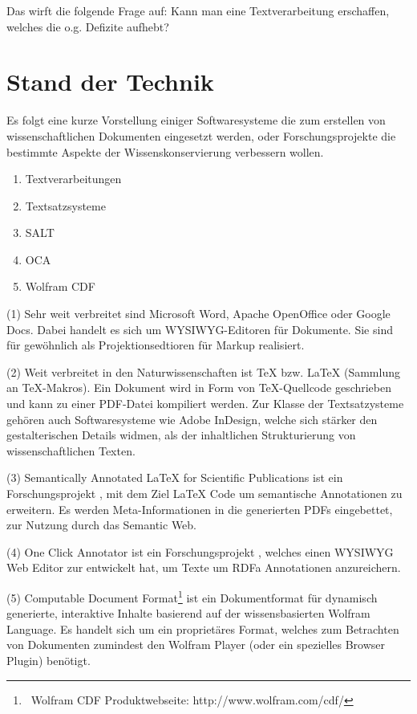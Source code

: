 Das wirft die folgende Frage auf: Kann man eine Textverarbeitung erschaffen, welches die o.g. Defizite aufhebt?

 
\section{Stand der Technik}\label{stand-der-technik}
 
Es folgt eine kurze Vorstellung einiger Softwaresysteme die zum erstellen von wissenschaftlichen Dokumenten eingesetzt werden, oder Forschungsprojekte die bestimmte Aspekte der Wissenskonservierung verbessern wollen.

 
\begin{enumerate}

\item Textverarbeitungen
\item Textsatzsysteme
\item SALT
\item OCA
\item Wolfram CDF
\end{enumerate}
 
(1) Sehr weit verbreitet sind Microsoft Word, Apache OpenOffice oder Google Docs. Dabei handelt es sich um WYSIWYG-Editoren für Dokumente. Sie sind für gewöhnlich als Projektionsedtioren für Markup realisiert.

 
(2) Weit verbreitet in den Naturwissenschaften ist TeX bzw. LaTeX (Sammlung an TeX-Makros). Ein Dokument wird in Form von TeX-Quellcode geschrieben und kann zu einer PDF-Datei kompiliert werden. Zur Klasse der Textsatzysteme gehören auch Softwaresysteme wie Adobe InDesign, welche sich stärker den gestalterischen Details widmen, als der inhaltlichen Strukturierung von wissenschaftlichen Texten.

 
(3) Semantically Annotated LaTeX for Scientific Publications ist ein Forschungsprojekt \citep{Groza}, mit dem Ziel LaTeX Code um semantische Annotationen zu erweitern. Es werden Meta-Informationen in die generierten PDFs eingebettet, zur Nutzung durch das Semantic Web.

 
(4) One Click Annotator ist ein Forschungsprojekt \citep{Heese}, welches einen WYSIWYG Web Editor zur entwickelt hat, um Texte um RDFa Annotationen anzureichern.

 
(5) Computable Document Format\footnote{~Wolfram CDF Produktwebseite: http://www.wolfram.com/cdf/} ist ein Dokumentformat für dynamisch generierte, interaktive Inhalte basierend auf der wissensbasierten Wolfram Language. Es handelt sich um ein proprietäres Format, welches zum Betrachten von Dokumenten zumindest den Wolfram Player (oder ein spezielles Browser Plugin) benötigt.

